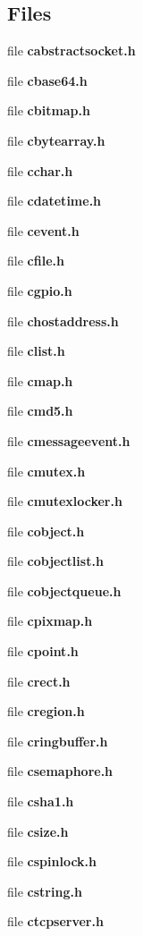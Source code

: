 \subsection*{Files}
\begin{DoxyCompactItemize}
\item 
file {\bf cabstractsocket.\+h}
\item 
file {\bf cbase64.\+h}
\begin{DoxyCompactList}\small\item\em 

 \end{DoxyCompactList}\item 
file {\bf cbitmap.\+h}
\item 
file {\bf cbytearray.\+h}
\item 
file {\bf cchar.\+h}
\item 
file {\bf cdatetime.\+h}
\item 
file {\bf cevent.\+h}
\item 
file {\bf cfile.\+h}
\item 
file {\bf cgpio.\+h}
\item 
file {\bf chostaddress.\+h}
\item 
file {\bf clist.\+h}
\item 
file {\bf cmap.\+h}
\item 
file {\bf cmd5.\+h}
\item 
file {\bf cmessageevent.\+h}
\item 
file {\bf cmutex.\+h}
\item 
file {\bf cmutexlocker.\+h}
\item 
file {\bf cobject.\+h}
\item 
file {\bf cobjectlist.\+h}
\item 
file {\bf cobjectqueue.\+h}
\item 
file {\bf cpixmap.\+h}
\item 
file {\bf cpoint.\+h}
\item 
file {\bf crect.\+h}
\item 
file {\bf cregion.\+h}
\item 
file {\bf cringbuffer.\+h}
\item 
file {\bf csemaphore.\+h}
\item 
file {\bf csha1.\+h}
\begin{DoxyCompactList}\small\item\em 

 \end{DoxyCompactList}\item 
file {\bf csize.\+h}
\item 
file {\bf cspinlock.\+h}
\item 
file {\bf cstring.\+h}
\item 
file {\bf ctcpserver.\+h}
\begin{DoxyCompactList}\small\item\em 


\end{DoxyCompactList}
\end{DoxyCompactItemize}
